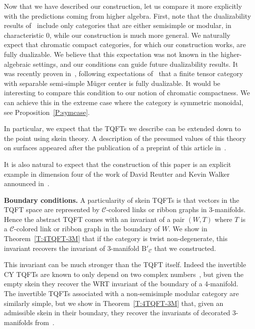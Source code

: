 \documentclass[pdftex]{sigma}
\numberwithin{equation}{section}
\numberwithin{theorem}{section}
\numberwithin{proposition}{section}
\numberwithin{definition}{section}
\numberwithin{lemma}{section}
\numberwithin{corollary}{section}
\numberwithin{remark}{section}
\numberwithin{example}{section}
\newcommand{\cat}{\mathcal{C}}
\newcommand{\ThreeManInv}{\mathrm{B}}
\newcommand{\BB}{\ThreeManInv}
\begin{document}
Now that we have described our construction, let us compare it more explicitly with the predictions coming from higher algebra. First, note that the dualizability results of~\cite{BJSS, BJS} include only categories that are either semisimple or modular, in characteristic 0,
while
our construction is much more general. We naturally expect that chromatic compact categories, for which our construction works, are fully dualizable. We believe that this expectation was not known in the higher-algebraic
settings,
 and our conditions can guide future dualizability results.
It was recently proven in~\cite{DecoppetRelativeInvert}, following expectations of~\cite{BJSS} that a finite tensor category with separable semi-simple M\"uger center is fully dualizable. It would be interesting to compare this condition to our notion of chromatic compactness. We can achieve this in the extreme case where the category is symmetric monoidal, see Proposition~\ref{P:symcase}.

In particular, we expect that the TQFTs we describe can be extended down to the point using skein theory. A description of the presumed values of this theory on surfaces appeared after the publication of a preprint of this article in~\cite{BH}.

It is also natural to expect that the construction of this paper is an explicit
example
 in dimension four of the work of David Reutter and Kevin Walker announced in~\cite{ReutterWalker1,Walker2021,ReutterWalker2}.

\textbf{Boundary conditions.}
A particularity of skein TQFTs is that vectors in the TQFT space are
represented by $\cat$-colored links or ribbon graphs in 3-manifolds.
Hence the abstract TQFT comes with an invariant of
a pair $(W,T)$ where $T$ is a $\cat$-colored link
or ribbon graph in the boundary of $W$. We show in Theorem~\ref{T:4TQFT-3M} that if the category is twist
non-degenerate, this invariant recovers the invariant of 3-manifold $\BB'_\cat$ that we constructed.

This invariant can be much stronger than the TQFT itself. Indeed the invertible CY TQFTs are known to only depend on two complex numbers~\cite[Theorem~7.6]{SP}, but given the empty skein they recover the WRT invariant of the boundary of a 4-manifold. The invertible TQFTs associated with a non-semisimple modular category are similarly simple, but we show in Theorem~\ref{T:4TQFT-3M} that, given an admissible skein in their boundary, they recover the invariants of decorated 3-manifolds from~\cite{DRGGPMR2022}.
\end{document}
